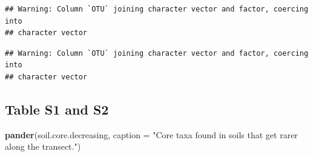 \documentclass[]{article}
\newenvironment{Shaded}{\begin{snugshade}}{\end{snugshade}}
\newcommand{\CommentTok}[1]{\textcolor[rgb]{0.56,0.35,0.01}{\textit{#1}}}
\newcommand{\DataTypeTok}[1]{\textcolor[rgb]{0.13,0.29,0.53}{#1}}
\newcommand{\DecValTok}[1]{\textcolor[rgb]{0.00,0.00,0.81}{#1}}
\newcommand{\KeywordTok}[1]{\textcolor[rgb]{0.13,0.29,0.53}{\textbf{#1}}}
\newcommand{\NormalTok}[1]{#1}
\newcommand{\OperatorTok}[1]{\textcolor[rgb]{0.81,0.36,0.00}{\textbf{#1}}}
\newcommand{\StringTok}[1]{\textcolor[rgb]{0.31,0.60,0.02}{#1}}
\begin{document}
\begin{verbatim}
## Warning: Column `OTU` joining character vector and factor, coercing into
## character vector
\end{verbatim}

\begin{Shaded}
\end{Shaded}

\begin{verbatim}
## Warning: Column `OTU` joining character vector and factor, coercing into
## character vector
\end{verbatim}

\hypertarget{table-s1-and-s2}{%
\subsection{Table S1 and S2}\label{table-s1-and-s2}}

\begin{Shaded}
\begin{Highlighting}[]
\KeywordTok{pander}\NormalTok{(soil.core.decreasing, }\DataTypeTok{caption =} \StringTok{"Core taxa found in soils that get rarer along the transect."}\NormalTok{)}
\end{Highlighting}
\end{Shaded}
\end{document}
